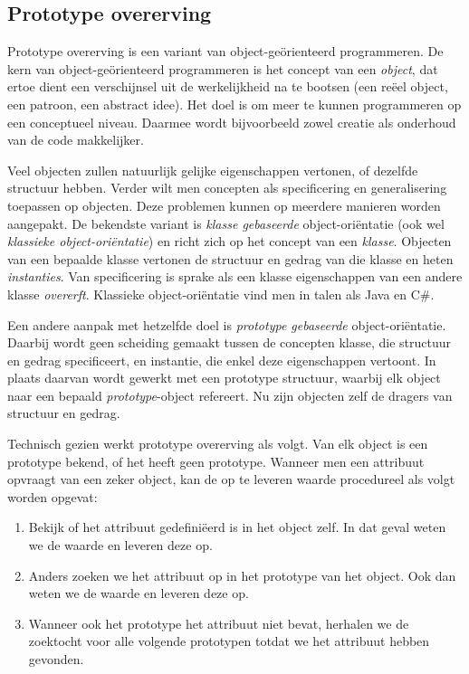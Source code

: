 \subsection{Prototype overerving}

Prototype overerving is een variant van object-geörienteerd programmeren. De kern van object-geörienteerd programmeren is het concept van een \emph{object}, dat ertoe dient een verschijnsel uit de werkelijkheid na te bootsen (een reëel object, een patroon, een abstract idee). Het doel is om meer te kunnen programmeren op een conceptueel niveau. Daarmee wordt bijvoorbeeld zowel creatie als onderhoud van de code makkelijker.

Veel objecten zullen natuurlijk gelijke eigenschappen vertonen, of dezelfde structuur hebben. Verder wilt men concepten als specificering en generalisering toepassen op objecten. Deze problemen kunnen op meerdere manieren worden aangepakt. De bekendste variant is \emph{klasse gebaseerde} object-oriëntatie (ook wel \emph{klassieke object-oriëntatie}) en richt zich op het concept van een \emph{klasse}. Objecten van een bepaalde klasse vertonen de structuur en gedrag van die klasse en heten \emph{instanties}. Van specificering is sprake als een klasse eigenschappen van een andere klasse \emph{overerft}. Klassieke object-oriëntatie vind men in talen als Java en C\#.

Een andere aanpak met hetzelfde doel is \emph{prototype gebaseerde} object-oriëntatie. Daarbij wordt geen scheiding gemaakt tussen de concepten klasse, die structuur en gedrag specificeert, en instantie, die enkel deze eigenschappen vertoont. In plaats daarvan wordt gewerkt met een prototype structuur, waarbij elk object naar een bepaald \emph{prototype}-object refereert. Nu zijn objecten zelf de dragers van structuur en gedrag.

Technisch gezien werkt prototype overerving als volgt. Van elk object is een prototype bekend, of het heeft geen prototype. Wanneer men een attribuut opvraagt van een zeker object, kan de op te leveren waarde procedureel als volgt worden opgevat:

\begin{enumerate}
  \item Bekijk of het attribuut gedefiniëerd is in het object zelf. In dat geval weten we de waarde en leveren deze op.
  \item Anders zoeken we het attribuut op in het prototype van het object. Ook dan weten we de waarde en leveren deze op.
  \item Wanneer ook het prototype het attribuut niet bevat, herhalen we de zoektocht voor alle volgende prototypen totdat we het attribuut hebben gevonden.
\end{enumerate}

